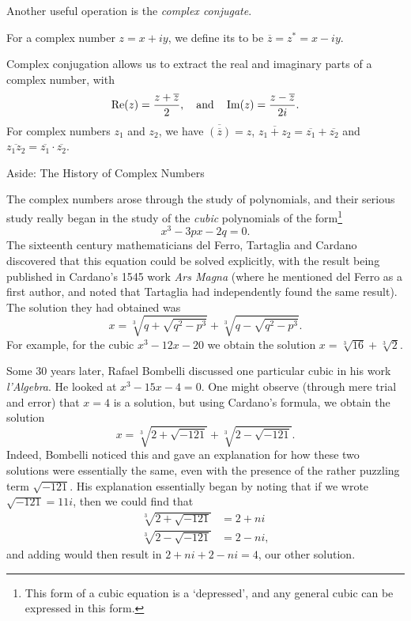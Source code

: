 \documentclass[a4paper]{scrartcl}
\begin{document}
Another useful operation is the \emph{complex conjugate}. 

\begin{definition}
  For a complex number $z = x + iy$, we define its  to be $\overline{z} = z^* = x - iy$.
\end{definition}

Complex conjugation allows us to extract the real and imaginary parts of a complex number, with
$$
\operatorname{Re}(z) = \frac{z+ \overline{z}}{2}, \quad \text{and} \quad \operatorname{Im}(z) = \frac{z - \overline{z}}{2i}.
$$
For complex numbers $z_1$ and $z_2$, we have $\overline{(\overline{z})} = z$, $\overline{z_1 + z_2} = \overline{z_1} + \overline{z_2}$ and $\overline{z_1 z_2} = \overline{z_1} \cdot  \overline{z_2}$.

\begin{aside}{Aside: The History of Complex Numbers}

The complex numbers arose through the study of polynomials, and their serious study really began in the study of the \emph{cubic} polynomials of the form\footnote{This form of a cubic equation is a `depressed', and any general cubic can be expressed in this form.}
$$
x^3 - 3px - 2q = 0.
$$
The sixteenth century mathematicians del Ferro, Tartaglia and Cardano discovered that this equation could be solved explicitly, with the result being published in Cardano's 1545 work \emph{Ars Magna} (where he mentioned del Ferro as a first author, and noted that Tartaglia had independently found the same result).
The solution they had obtained was
$$
x = \sqrt[3]{q + \sqrt{q^2 - p^3}} + \sqrt[3]{q - \sqrt{q^2 - p^3}}.
$$
For example, for the cubic $x^3 - 12x - 20$ we obtain the solution $x = \sqrt[3]{16} + \sqrt[3]{2}$. 

Some 30 years later, Rafael Bombelli discussed one particular cubic in his work \emph{l'Algebra}. He looked at $x^3 - 15x - 4 = 0$.
One might observe (through mere trial and error) that $x = 4$ is a solution, but using Cardano's formula, we obtain the solution
$$
x = \sqrt[3]{2 + \sqrt{-121}} + \sqrt[3]{2 - \sqrt{-121}}.
$$
Indeed, Bombelli noticed this and gave an explanation for how these two solutions were essentially the same, even with the presence of the rather puzzling term $\sqrt{-121}$.
His explanation essentially began by noting that if we wrote $\sqrt{-121} = 11i$, then we could find that
\begin{align*}
	\sqrt[3]{2 + \sqrt{-121}} &= 2 + ni \\
	\sqrt[3]{2 - \sqrt{-121}} &= 2 - ni,
\end{align*}
and adding would then result in $2 + ni + 2 - ni = 4$, our other solution.


\end{aside}
\end{document}
